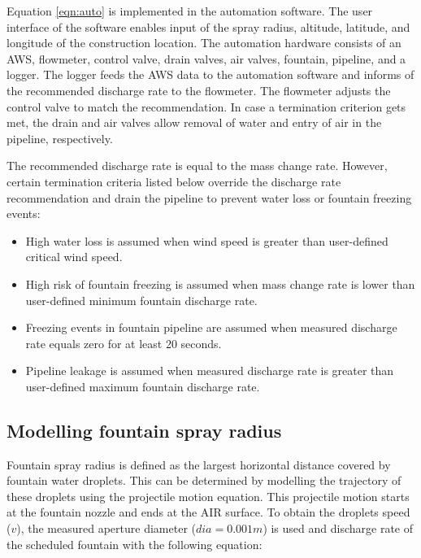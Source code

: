 \documentclass[tc, manuscript]{copernicus}
\begin{document}
Equation \ref{eqn:auto} is implemented in the automation software. The user interface of the software enables
input of the spray radius, altitude, latitude, and longitude of the construction location. The automation
hardware consists of an AWS, flowmeter, control valve, drain valves, air valves, fountain, pipeline, and a
logger. The logger feeds the AWS data to the automation software and informs of the recommended discharge rate
to the flowmeter. The flowmeter adjusts the control valve to match the recommendation. In case a termination
criterion gets met, the drain and air valves allow removal of water and entry of air in the pipeline,
respectively.

The recommended discharge rate is equal to the mass change rate. However, certain termination criteria listed
below override the discharge rate recommendation and drain the pipeline to prevent water loss or fountain
freezing events:

\begin{itemize}

\item High water loss is assumed when wind speed is greater than user-defined critical wind speed.

\item High risk of fountain freezing is assumed when mass change rate is lower than user-defined minimum fountain discharge rate. 

\item Freezing events in fountain pipeline are assumed when measured discharge rate equals zero for at least 20
  seconds. 

\item Pipeline leakage is assumed when measured discharge rate is greater than user-defined maximum fountain discharge rate.

\end{itemize}

\subsection{Modelling fountain spray radius} \label{sec:r_F}

Fountain spray radius is defined as the largest horizontal distance covered by fountain water droplets. This can
be determined by modelling the trajectory of these droplets using the projectile motion equation. This
projectile motion starts at the fountain nozzle and ends at the AIR surface.  To obtain the droplets speed
($v$), the measured aperture diameter ($dia = 0.001 m$) is used and discharge rate of the scheduled fountain
with the following equation:
\end{document}
